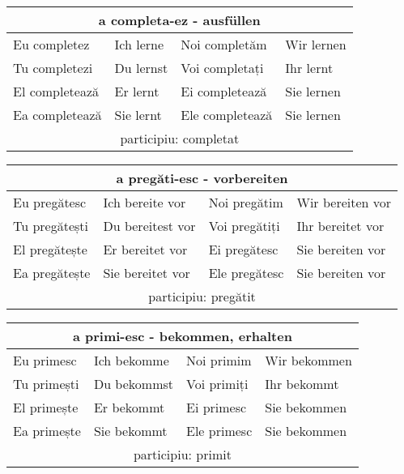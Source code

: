 \documentclass[11pt, oneside]{article}
\begin{document}
%
\begin{center}
  \begin{tabular}{ |p{3.25cm}|p{3.25cm}||p{3.25cm}|p{3.25cm}| }
      \hline
      \multicolumn{4}{|c|}{a completa-ez - ausfüllen} \\
      \hline
      \hline
      Eu completez & Ich lerne & Noi completăm & Wir lernen\\
      \hline
      Tu completezi & Du lernst & Voi completați & Ihr lernt\\
      \hline
      El completează & Er lernt & Ei completează & Sie lernen\\ 
      Ea completează & Sie lernt & Ele completează & Sie lernen\\
      \hline
      \multicolumn{4}{|c|}{participiu: completat} \\
      \hline
     \end{tabular}
\end{center}
%
%
\begin{center}
  \begin{tabular}{ |p{3.25cm}|p{3.25cm}||p{3.25cm}|p{3.25cm}| }
      \hline
      \multicolumn{4}{|c|}{a pregăti-esc - vorbereiten} \\
      \hline
      \hline
      Eu pregătesc & Ich bereite vor & Noi pregătim & Wir bereiten vor\\
      \hline
      Tu pregătești & Du bereitest vor & Voi pregătiți & Ihr bereitet vor\\
      \hline
      El pregătește & Er bereitet vor  & Ei pregătesc & Sie bereiten vor\\ 
      Ea pregătește & Sie bereitet vor & Ele pregătesc & Sie bereiten vor\\
      \hline
      \multicolumn{4}{|c|}{participiu: pregătit} \\
      \hline
     \end{tabular}
\end{center}
%
%
\begin{center}
  \begin{tabular}{ |p{3.25cm}|p{3.25cm}||p{3.25cm}|p{3.25cm}| }
      \hline
      \multicolumn{4}{|c|}{a primi-esc - bekommen, erhalten} \\
      \hline
      \hline
      Eu primesc & Ich bekomme & Noi primim & Wir bekommen\\
      \hline
      Tu primești & Du bekommst & Voi primiți & Ihr bekommt\\
      \hline
      El primește & Er bekommt & Ei primesc & Sie bekommen\\ 
      Ea primește & Sie bekommt & Ele primesc & Sie bekommen\\
      \hline
      \multicolumn{4}{|c|}{participiu: primit} \\
      \hline
     \end{tabular}
\end{center}
\end{document}
